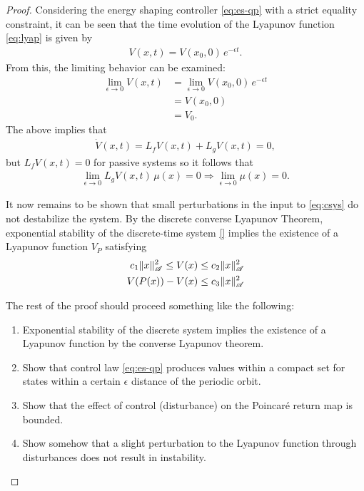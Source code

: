 \documentclass[twocolumn]{article}
\newcommand{\limeps}{\lim_{\epsilon \to 0}}
\begin{document}
\begin{proof}
  Considering the energy shaping controller \eqref{eq:es-qp} with a strict equality constraint, it can be seen that the time evolution of the Lyapunov function \eqref{eq:lyap} is given by
  \begin{align*}
    V(x, t) = V(x_{0}, 0) \, e^{-\epsilon t}.
  \end{align*}
  From this, the limiting behavior can be examined:
  \begin{align*}
    \limeps V(x, t) &= \limeps V(x_{0}, 0) \, e^{-\epsilon t}\\
    &= V(x_{0}, 0)\\
    &= V_0.
  \end{align*}
  The above implies that
  \begin{align*}
    {\dot V}(x, t) = L_{f} V(x, t) + L_{g} V(x, t) = 0,
  \end{align*}
  but $L_{f} V(x, t) = 0$ for passive systems so it follows that
  \begin{align*}
    \limeps L_{g} V(x, t) \, \mu(x) = 0 \Rightarrow \limeps \mu(x) = 0.
  \end{align*}

  It now remains to be shown that small perturbations in the input to \eqref{eq:csys} do not destabilize the system. By the discrete converse Lyapunov Theorem, exponential stability of the discrete-time system \eqref{} implies the existence of a Lyapunov function $V_{P}$ satisfying
\begin{align*}
  c_{1} \| x \|^{2}_{\mathscr{A}} \leq V(x) \leq c_{2} \| x \|_{\mathscr{A}}^2\\
  V(P(x)) - V(x) \leq c_{3} \| x \|^{2}_{\mathscr{A}}
\end{align*}

The rest of the proof should proceed something like the following:
\begin{enumerate}
\item Exponential stability of the discrete system implies the existence of a Lyapunov function by the converse Lyapunov theorem.
\item Show that control law \eqref{eq:es-qp} produces values within a compact set for states within a certain $\epsilon$ distance of the periodic orbit.
\item Show that the effect of control (disturbance) on the Poincar{\'e} return map is bounded.
\item Show somehow that a slight perturbation to the Lyapunov function through disturbances does not result in instability.
\end{enumerate}

\end{proof}
\end{document}
